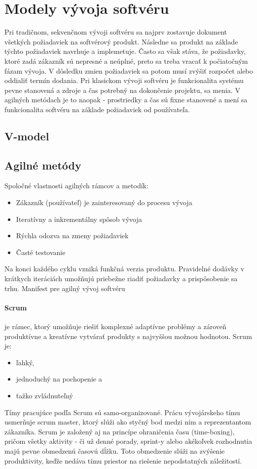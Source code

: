 \documentclass[10pt,twoside,slovak,a4paper,oneside]{article}
\begin{document}
\section{Modely vývoja softvéru}
Pri tradičnom, sekvenčnom vývoji softvéru sa najprv zostavuje dokument všetkých požiadaviek na softvérový produkt. Následne sa produkt na základe týchto požiadaviek navrhuje a implemetuje. Často sa však stáva, že požiadavky, ktoré zadá zákazník sú nepresné a neúplné, preto sa treba vracať k počiatočným fázam vývoja. V dôsledku zmien požiadaviek sa potom musí zvýšiť rozpočet alebo oddialiť termín dodania. 
Pri klasickom vývoji softvéru je funkcionalita systému pevne stanovená a zdroje a čas potrebný na dokončenie projektu, sa menia. V agilných metódach je to naopak - prostriedky a čas sú fixne stanovené a mení sa funkcionalita softvéru na základe požiadaviek od používateľa.
\subsection{V-model}


\subsection{Agilné metódy}
Spoločné vlastnosti agilných rámcov a metodík:
\begin{itemize}
\item Zákazník (používateľ) je zainteresovaný do procesu vývoja
\item Iteratívny a inkrementálny spôsob vývoja 
\item Rýchla odozva na zmeny požiadaviek
\item Časté testovanie
\end{itemize}
Na konci každého cyklu vzniká funkčná verzia produktu. Pravidelné dodávky v krátkych iteráciách umožňujú priebežne riadiť požiadavky a prispôsobenie sa trhu. 
Manifest pre agilný vývoj softvéru

\paragraph{Scrum}je rámec, ktorý umožňuje riešiť komplexné adaptívne problémy a zároveň produktívne a kreatívne vytvárať produkty s najvyššou možnou hodnotou. Scrum je: 
\begin{itemize}
\item  ľahký,
\item jednoduchý na pochopenie a
\item ťažko zvládnuteľný
\end{itemize}
Tímy pracujúce podľa Scrum sú samo-organizované. Prácu vývojárskeho tímu usmerňuje scrum master, ktorý slúži ako styčný bod medzi ním a reprezentantom zákazníka. Scrum je založený aj na princípe ohraničenia času (time-boxing), pričom všetky aktivity - či už denné porady, sprint-y alebo akékoľvek rozhodnutia majú pevne obmedzenú časovú dĺžku. Toto obmedzenie slúži na zvýšenie produktivity, keďže nedáva tímu priestor na riešenie nepodstatných záležitostí. 
\end{document}
